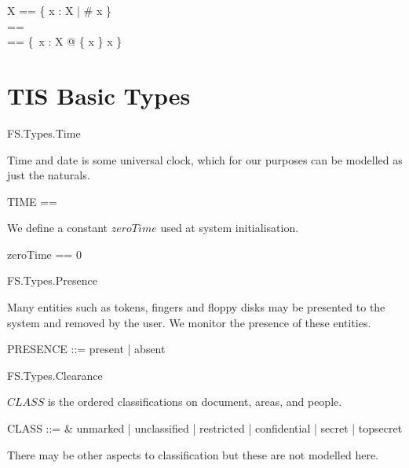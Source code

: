 
\begin{zed}
        \Optional X == \{ x : \finset X | \# x \}
\\      \Nil[X] == \emptyset[X]
\\      \The[X] == \{~x : X @ \{ x \} \mapsto x \}
\end{zed}

\section{TIS Basic Types}

\begin{traceunit}{FS.Types.Time}
\end{traceunit}

Time and date is some universal clock,
which for our purposes can be modelled as just the naturals.
\begin{zed}
	TIME == \nat
\end{zed}

We define a constant $zeroTime$ used at system initialisation.

\begin{zed}
        zeroTime == 0
\end{zed}

\begin{traceunit}{FS.Types.Presence}
\end{traceunit}

Many entities such as tokens, fingers and floppy disks may be
presented to the system and removed by the user. We monitor the
presence of these entities.
\begin{zed}
	PRESENCE ::= present | absent
\end{zed}

\begin{traceunit}{FS.Types.Clearance}
\end{traceunit}


$CLASS$ is the ordered classifications on document, areas, and people.
\begin{syntax}
	CLASS ::= & unmarked | unclassified | restricted | confidential |
		secret | topsecret
\end{syntax}

There may be other aspects to classification but these are not
modelled here.

